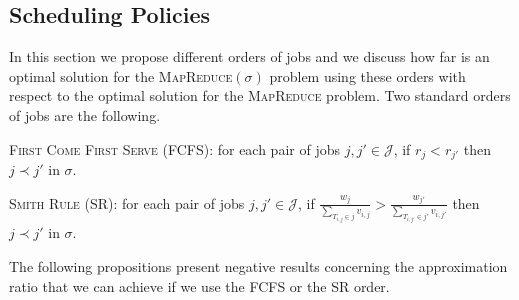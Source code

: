 \documentclass{llncs}
\newcommand{\mr}{\textsc{MapReduce}\xspace}
\newcommand{\mrs}{\textsc{MapReduce$(\sigma)$}\xspace}
\newcommand{\fcfs}{\textsc{FCFS}\xspace}
\newcommand{\sr}{\textsc{SR}\xspace}
\begin{document}
\subsection{Scheduling Policies}

In this section we propose different orders of jobs and we discuss how far is an optimal solution for the \mrs problem using these orders
with respect to the optimal solution for the \mr problem.
Two standard orders of jobs are the following.
\bigskip

\noindent\textsc{First Come First Serve} (\fcfs): for each pair of jobs $j,j' \in \mathcal{J}$, if $r_j<r_{j'}$ then $j \prec j'$ in $\sigma$.
\smallskip

\noindent\textsc{Smith Rule} (\sr): for each pair of jobs $j,j' \in \mathcal{J}$,
if $\frac{w_j}{\sum_{T_{i,j} \in j} v_{i,j}} > \frac{w_{j'}}{\sum_{T_{i,j'} \in j'} v_{i,j'}}$ then $j \prec j'$ in $\sigma$.
\bigskip


The following propositions present negative results concerning the approximation ratio that we can achieve if we use the \fcfs or the \sr order.
\end{document}
